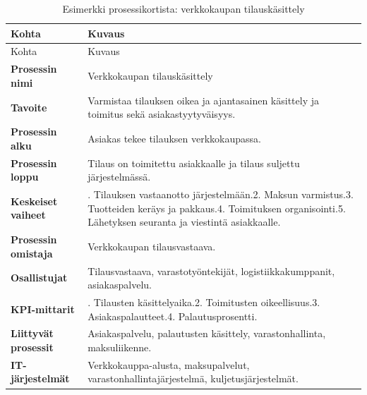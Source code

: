 \documentclass[
  finnish,
  letterpaper,
  DIV=11,
  numbers=noendperiod,
  oneside]{scrreprt}
\begin{document}
\begin{longtable}[]{@{}
  >{\raggedright\arraybackslash}p{}
  >{\raggedright\arraybackslash}p{}@{}}
\caption{Esimerkki prosessikortista: verkkokaupan
tilauskäsittely}\label{tbl-prosessikortti-esim}\tabularnewline
\toprule\noalign{}
\begin{minipage}[b]{\linewidth}\raggedright
Kohta
\end{minipage} & \begin{minipage}[b]{\linewidth}\raggedright
Kuvaus
\end{minipage} \\
\midrule\noalign{}
\endfirsthead
\toprule\noalign{}
\begin{minipage}[b]{\linewidth}\raggedright
Kohta
\end{minipage} & \begin{minipage}[b]{\linewidth}\raggedright
Kuvaus
\end{minipage} \\
\midrule\noalign{}
\endhead
\bottomrule\noalign{}
\endlastfoot
\textbf{Prosessin nimi} & Verkkokaupan tilauskäsittely \\
\textbf{Tavoite} & Varmistaa tilauksen oikea ja ajantasainen käsittely
ja toimitus sekä asiakastyytyväisyys. \\
\textbf{Prosessin alku} & Asiakas tekee tilauksen verkkokaupassa. \\
\textbf{Prosessin loppu} & Tilaus on toimitettu asiakkaalle ja tilaus
suljettu järjestelmässä. \\
\textbf{Keskeiset vaiheet} & 1. Tilauksen vastaanotto järjestelmään.2.
Maksun varmistus.3. Tuotteiden keräys ja pakkaus.4. Toimituksen
organisointi.5. Lähetyksen seuranta ja viestintä asiakkaalle. \\
\textbf{Prosessin omistaja} & Verkkokaupan tilausvastaava. \\
\textbf{Osallistujat} & Tilausvastaava, varastotyöntekijät,
logistiikkakumppanit, asiakaspalvelu. \\
\textbf{KPI-mittarit} & 1. Tilausten käsittelyaika.2. Toimitusten
oikeellisuus.3. Asiakaspalautteet.4. Palautusprosentti. \\
\textbf{Liittyvät prosessit} & Asiakaspalvelu, palautusten käsittely,
varastonhallinta, maksuliikenne. \\
\textbf{IT-järjestelmät} & Verkkokauppa-alusta, maksupalvelut,
varastonhallintajärjestelmä, kuljetusjärjestelmät. \\
\end{longtable}
\end{document}
